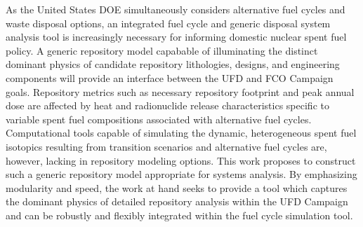 As the United States \gls{DOE} simultaneously considers alternative fuel cycles 
and waste disposal options, an integrated fuel cycle and generic disposal system 
analysis tool is increasingly necessary for informing domestic nuclear spent 
fuel policy. A generic repository model capabable of illuminating the distinct 
dominant physics of candidate repository lithologies, designs, and engineering 
components will provide an interface between the \gls{UFD} and \gls{FCO} Campaign 
goals. Repository metrics such as necessary repository footprint and peak annual 
dose are affected by heat and radionuclide release characteristics specific to 
variable spent fuel compositions associated  with alternative fuel cycles. 
Computational tools capable of simulating the dynamic, heterogeneous spent fuel 
isotopics resulting from transition scenarios and alternative fuel cycles 
are, however, lacking in repository modeling  options. This work proposes to 
construct such a generic repository model appropriate for systems analysis. By 
emphasizing modularity and speed, the work at hand seeks to  provide a tool 
which captures the dominant physics of detailed repository analysis within the 
\gls{UFD} Campaign and can be robustly and flexibly integrated within the 
\Cyclus fuel cycle simulation tool.

\glsresetall

